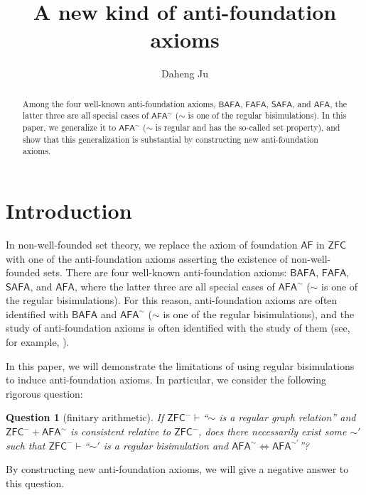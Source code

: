 \documentclass{amsart}
\title[A new kind of anti-foundation axioms]%
      {A new kind of anti-foundation axioms}
\author[Ju]{Daheng Ju}
\newcommand{\ZFC}{\mathsf{ZFC}}
\newcommand{\zfc}{\mathsf{ZFC}}
\newcommand{\AF}{\mathsf{AF}}
\newcommand{\BAFA}{\mathsf{BAFA}}
\newcommand{\FAFA}{\mathsf{FAFA}}
\newcommand{\SAFA}{\mathsf{SAFA}}
\newcommand{\AFA}{\mathsf{AFA}}
\newcommand{\afa}{\mathsf{AFA}}
\newtheorem{question}{Question}
\begin{document}
\begin{abstract}

Among the four well-known anti-foundation axioms, $\BAFA$, $\FAFA$, $\SAFA$, and $\AFA$, the latter three are all special cases of $\AFA^\sim$ ($\sim$ is one of the regular bisimulations). In this paper, we generalize it to $\AFA^\sim$ ($\sim$ is regular and has the so-called set property), and show that this generalization is substantial by constructing new anti-foundation axioms.

\end{abstract}

\maketitle

\tableofcontents

\newcommand\JD[1]{{\color{blue}(JD: #1)}}

\section{Introduction}

In non-well-founded set theory, we replace the axiom of foundation $\AF$ in $\ZFC$ with one of the anti-foundation axioms asserting the existence of non-well-founded sets. There are four well-known anti-foundation axioms: $\BAFA$, $\FAFA$, $\SAFA$, and $\AFA$, where the latter three are all special cases of $\AFA^\sim$ ($\sim$ is one of the regular bisimulations). For this reason, anti-foundation axioms are often identified with $\BAFA$ and $\AFA^\sim$ ($\sim$ is one of the regular bisimulations), and the study of anti-foundation axioms is often identified with the study of them (see, for example, \cite{Daghighi}\cite{Ju}).

In this paper, we will demonstrate the limitations of using regular bisimulations to induce anti-foundation axioms. In particular, we consider the following rigorous question:

\begin{question}[finitary arithmetic]
If $\zfc^-\vdash$``$\sim$ is a regular graph relation'' and $\zfc^-+\afa^\sim$ is consistent relative to $\zfc^-$, does there necessarily exist some $\sim'$ such that $\zfc^-\vdash$``$\sim'$ is a regular bisimulation and $\afa^\sim\Leftrightarrow\afa^{\sim'}$''?
\end{question}

By constructing new anti-foundation axioms, we will give a negative answer to this question.
\end{document}
